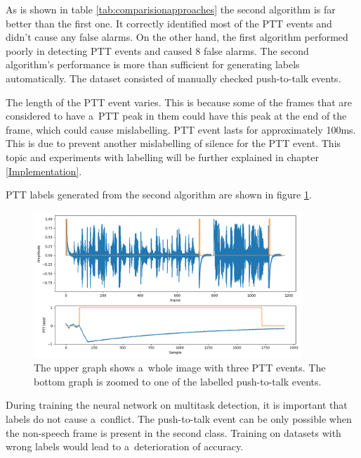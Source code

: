     \vspace{0.2cm}

    As is shown in table \ref{tab:comparisionapproaches} the second algorithm is far better than the first one. It correctly identified most of the PTT events and didn't cause any false alarms. On the other hand, the first algorithm performed poorly in detecting PTT events and caused 8 false alarms. The second algorithm's performance is more than sufficient for generating labels automatically. The dataset consisted of manually checked push-to-talk events. 

    The length of the PTT event varies. This is because some of the frames that are considered to have a~PTT peak in them could have this peak at the end of the frame, which could cause mislabelling. PTT event lasts for approximately 100ms. This is due to prevent another mislabelling of silence for the PTT event. This topic and experiments with labelling will be further explained in chapter \ref{Implementation}. 

    PTT labels generated from the second algorithm are shown in figure \ref{fig:pttlabels}.
    
        \begin{figure}[ht!]
            \centering
            \includegraphics[width = 0.9\textwidth]{obrazky-figures/PTTlabel.png}
            \caption{The upper graph shows a~whole image with three PTT events. The bottom graph is zoomed to one of the labelled push-to-talk events. }
            \label{fig:pttlabels}
        \end{figure}

    During training the neural network on multitask detection, it is important that labels do not cause a~conflict. The push-to-talk event can be only possible when the non-speech frame is present in the second class. Training on datasets with wrong labels would lead to a~deterioration of accuracy.

